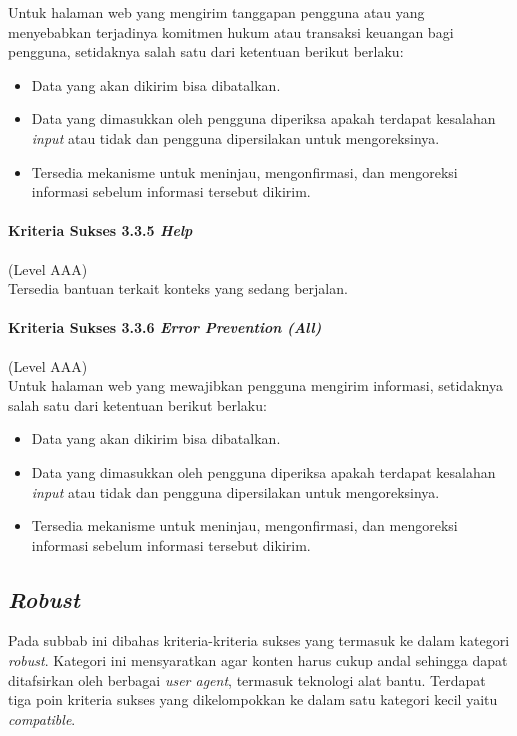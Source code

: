 Untuk halaman web yang mengirim tanggapan pengguna atau yang menyebabkan terjadinya komitmen hukum atau transaksi keuangan bagi pengguna, setidaknya salah satu dari ketentuan berikut berlaku:
\begin{itemize}
	\item Data yang akan dikirim bisa dibatalkan.
	\item Data yang dimasukkan oleh pengguna diperiksa apakah terdapat kesalahan \textit{input} atau tidak dan pengguna dipersilakan untuk mengoreksinya.
	\item Tersedia mekanisme untuk meninjau, mengonfirmasi, dan mengoreksi informasi sebelum informasi tersebut dikirim.
\end{itemize}

\paragraph{Kriteria Sukses 3.3.5 \textit{Help}}
\label{sec:kriteria_sukses_3.3.5}
(Level AAA)\\

Tersedia bantuan terkait konteks yang sedang berjalan.

\paragraph{Kriteria Sukses 3.3.6 \textit{Error Prevention (All)}}
\label{sec:kriteria_sukses_3.3.6}
(Level AAA)\\

Untuk halaman web yang mewajibkan pengguna mengirim informasi, setidaknya salah satu dari ketentuan berikut berlaku:
\begin{itemize}
	\item Data yang akan dikirim bisa dibatalkan.
	\item Data yang dimasukkan oleh pengguna diperiksa apakah terdapat kesalahan \textit{input} atau tidak dan pengguna dipersilakan untuk mengoreksinya.
	\item Tersedia mekanisme untuk meninjau, mengonfirmasi, dan mengoreksi informasi sebelum informasi tersebut dikirim.
\end{itemize}


\subsection{\textit{Robust}}
\label{sec:robust}
Pada subbab ini dibahas kriteria-kriteria sukses yang termasuk ke dalam kategori \textit{robust}. Kategori ini mensyaratkan agar konten harus cukup andal sehingga dapat ditafsirkan oleh berbagai \textit{user agent}, termasuk teknologi alat bantu. Terdapat tiga poin kriteria sukses yang dikelompokkan ke dalam satu kategori kecil yaitu \textit{compatible}.

